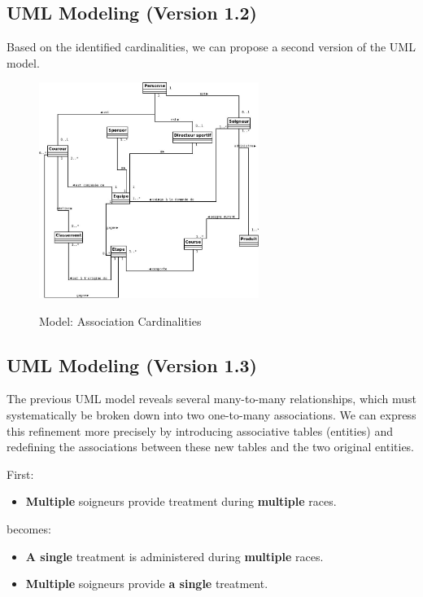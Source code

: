 \subsection{UML Modeling (Version 1.2)}

Based on the identified cardinalities, we can propose a second version of the UML model.

\begin{figure}[H]
\begin{center}
\includegraphics[height=7cm]{img/Figure2.jpg}\\
\caption{Model: Association Cardinalities}
\label{fig3}
\end{center}
\end{figure}

\newpage

\subsection{UML Modeling (Version 1.3)}
The previous UML model reveals several many-to-many relationships, which must systematically be broken down into two one-to-many associations. We can express this refinement more precisely by introducing associative tables (entities) and redefining the associations between these new tables and the two original entities.

First:
\begin{itemize}
\item \textbf{Multiple} soigneurs provide treatment during \textbf{multiple} races.
\end{itemize}
becomes:
\begin{itemize}
\item \textbf{A single} treatment is administered during \textbf{multiple} races.
\item \textbf{Multiple} soigneurs provide \textbf{a single} treatment.
\end{itemize}

